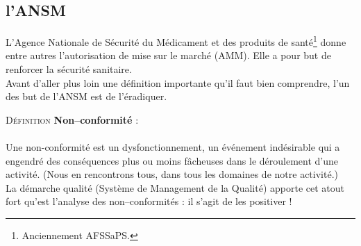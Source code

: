 \documentclass[a4paper,11pt]{article}
\newcounter{defi}
\newcommand{\defi}[1]{\addtocounter{defi}{1}%
  \noindent\textsc{Définition \thedefi } \textbf{#1} :\\ }
\begin{document}
\begin{sloppypar}
\subsection{l'ANSM}
L'Agence Nationale de Sécurité du Médicament et des produits de santé\footnote{Anciennement AFSSaPS.} donne entre autres l'autorisation de mise sur le marché (AMM).
Elle a pour but de renforcer la sécurité sanitaire.\\

Avant d'aller plus loin une définition importante qu'il faut bien comprendre, l'un des but de l'ANSM est de l'éradiquer.\\

\defi{Non--conformité}\\
Une non-conformité est un dysfonctionnement, un événement indésirable qui a engendré des conséquences plus ou moins fâcheuses dans le déroulement d'une activité.
(Nous en rencontrons tous, dans tous les domaines de notre activité.)\\

La démarche qualité (Système de Management de la Qualité) apporte cet atout fort qu'est l'analyse des non--conformités : il s'agit de les positiver !\\


\end{sloppypar}
\end{document}
